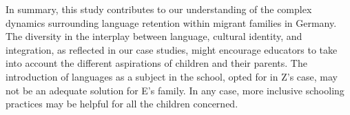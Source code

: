 \documentclass[output=paper,colorlinks,citecolor=brown]{langscibook}
\begin{document}
In summary, this study contributes to our understanding of the complex dynamics surrounding  language retention within migrant families in Germany. The diversity in the interplay between language, cultural identity, and integration, as reflected in our case studies, might encourage educators to take into account the different aspirations of children and their parents. The introduction of  languages as a subject in the  school, opted for in Z's case, may not be an adequate solution for E's family. In any case, more inclusive schooling practices may be helpful for all the children concerned.

\sloppy
\printbibliography[heading=subbibliography,notkeyword=this]
\end{document}

